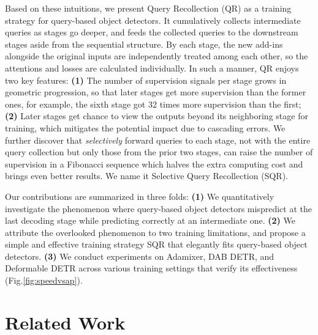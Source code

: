 \documentclass[10pt,twocolumn,letterpaper]{article}
\begin{document}
Based on these intuitions, we present Query Recollection (QR) as a training strategy for query-based object detectors. It cumulatively collects intermediate queries as stages go deeper, and feeds the collected queries to the downstream stages aside from the sequential structure. By each stage, the new add-ins alongside the original inputs are independently treated among each other, so the attentions and losses are calculated individually. In such a manner, QR enjoys two key features: \textbf{(1)} The number of supervision signals per stage grows in geometric progression, so that later stages get more supervision than the former ones, for example, the sixth stage got 32 times more supervision than the first; \textbf{(2)} Later stages get chance to view the outputs beyond its neighboring stage for training, which mitigates the potential impact due to cascading errors. We further discover that \textit{selectively} forward queries to each stage, not with the entire query collection but only those from the prior two stages, can raise the number of supervision in a Fibonacci sequence which halves the extra computing cost and brings even better results. We name it Selective Query Recollection (SQR).

Our contributions are summarized in three folds: \textbf{(1)} We quantitatively investigate the phenomenon where query-based object detectors mispredict at the last decoding stage while predicting correctly at an intermediate one. \textbf{(2)} We attribute the overlooked phenomenon to two training limitations, and propose a simple and effective training strategy SQR that elegantly fits query-based object detectors. \textbf{(3)} We conduct experiments on Adamixer, DAB DETR, and Deformable DETR across various training settings that verify its effectiveness (Fig.\ref{fig:speedvsap}).



\begin{comment}
SQR is designed to supervise the stages of decoder with a emphasis on the later ones, and meanwhile preserving the awareness of queries from the early ones. It fits most existing query-based object detectors without modifying their structures or inference pipelines, but brings significant improvement to them, including Deformable DETR(+), DAB DETR(+), and Adamixer(+).
\end{comment}


\section{Related Work}
\label{sec:relatedwork}
\end{document}
